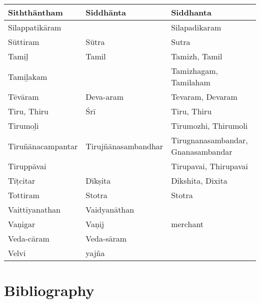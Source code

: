 \begin{longtable}{|p{2.5cm}|p{2.5cm}|p{3cm}|}
\hline
Siththāntham & Siddhānta & Siddhanta \\
\hline
Silappatikāram &  & Silapadikaram \\
\hline
Sūttiram & Sūtra & Sutra \\
\hline
Tamiḻ & Tamil & Tamizh, Tamil \\
\hline
Tamiḻakam &  & Tamizhagam, Tamilaham \\
\hline
Tēvāram & Deva-aram & Tevaram, Devaram \\
\hline
Tiru, Thiru & Śrī & Tiru, Thiru \\
\hline
Tirumoḻi &  & Tirumozhi, Thirumoli \\
\hline
Tiruñānacampan\-tar & Tirujñānasam\-bandhar & Tirugnanasambandar, Gnanasambandar \\
\hline
Tiruppāvai &  & Tirupavai, Thirupavai \\
\hline
Tīṭcitar & Dīkṣita & Dikshita, Dixita \\
\hline
Tottiram & Stotra & Stotra \\
\hline
Vaittiyanathan & Vaidyanāthan &  \\
\hline
Vaņigar & Vaņij & merchant \\
\hline
Veda-cāram & Veda-sāram  &  \\
\hline
Velvi & yajña &  \\
\hline
\end{longtable}


\section*{Bibliography}

